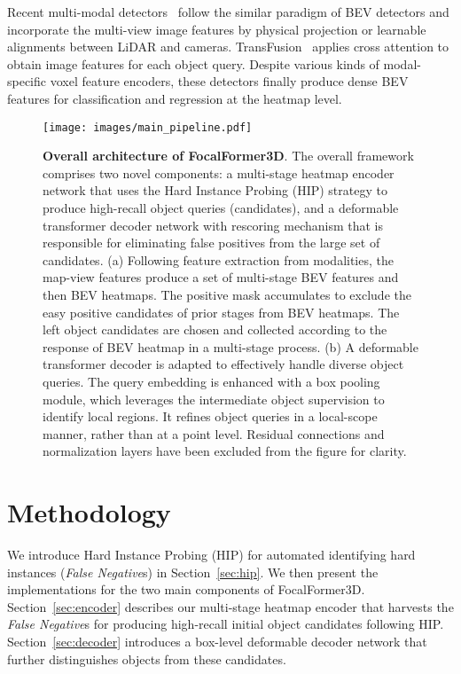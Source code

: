 \documentclass[10pt,twocolumn,letterpaper]{article}
\begin{document}
Recent multi-modal detectors~\cite{bevfusion, bevfusionmit, li2022uvtr, li2022deepfusion, futr3d, pointaugmenting} follow the similar paradigm of BEV detectors and incorporate the multi-view image features by physical projection or learnable alignments between LiDAR and cameras. TransFusion~\cite{transfusion} applies cross attention to obtain image features for each object query. Despite various kinds of modal-specific voxel feature encoders, these detectors finally produce dense BEV features for classification and regression at the heatmap level.









\begin{figure*}
	\begin{center}
		\texttt{[image: images/main\_pipeline.pdf]}
	\end{center}
	\caption{\textbf{Overall architecture of FocalFormer3D}. The overall framework comprises two novel components: a multi-stage heatmap encoder network that uses the Hard Instance Probing (HIP) strategy to produce high-recall object queries (candidates), and a deformable transformer decoder network with rescoring mechanism that is responsible for eliminating false positives from the large set of candidates. (a) Following feature extraction from modalities, the map-view features produce a set of multi-stage BEV features and then BEV heatmaps. The positive mask accumulates to exclude the easy positive candidates of prior stages from BEV heatmaps. The left object candidates are chosen and collected according to the response of BEV heatmap in a multi-stage process. (b) A deformable transformer decoder is adapted to effectively handle diverse object queries. The query embedding is enhanced with a box pooling module, which leverages the intermediate object supervision to identify local regions. It refines object queries in a local-scope manner, rather than at a point level. Residual connections and normalization layers have been excluded from the figure for clarity.}
	\label{fig:pipeline}
\end{figure*}

\section{Methodology}

We introduce Hard Instance Probing (HIP) for automated identifying hard instances (\textit{False Negative}s) in Section~\ref{sec:hip}. We then present the implementations for the two main components of FocalFormer3D.
Section~\ref{sec:encoder} describes our multi-stage heatmap encoder that harvests the \textit{False Negative}s for producing high-recall initial object candidates following HIP. Section~\ref{sec:decoder} introduces a box-level deformable decoder network that further distinguishes objects from these candidates. 
\end{document}
